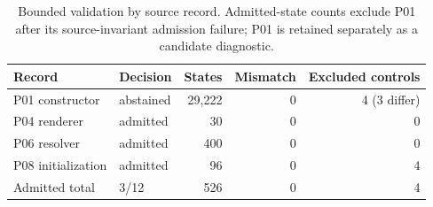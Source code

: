 \begin{table}[htbp]
\caption{Bounded validation by source record. Admitted-state counts exclude P01 after its source-invariant admission failure; P01 is retained separately as a candidate diagnostic.}\label{tab:adapter-cases}
\centering
\begin{tabular}{llrrr}
\toprule
Record & Decision & States & Mismatch & Excluded controls\\\midrule
P01 constructor & abstained & 29,222 & 0 & 4 (3 differ)\\
P04 renderer & admitted & 30 & 0 & 0\\
P06 resolver & admitted & 400 & 0 & 0\\
P08 initialization & admitted & 96 & 0 & 4\\
Admitted total & 3/12 & 526 & 0 & 4\\
\bottomrule
\end{tabular}
\end{table}
